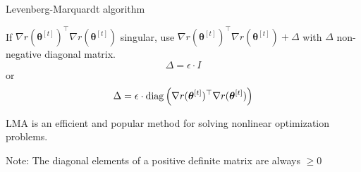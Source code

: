 \documentclass[11pt,compress,t,notes=noshow, xcolor=table]{beamer}
\begin{document}
%
%
%
%
\begin{vbframe}{Levenberg-Marquardt algorithm}

If $\nabla r(\bm{\theta}^{[t]})^\top\nabla r(\bm{\theta}^{[t]})$ singular, use $\nabla r(\bm{\theta}^{[t]})^\top\nabla r(\bm{\theta}^{[t]})+\Delta$ with $\Delta$ non-negative diagonal matrix.
\lz
$$
\Delta = \epsilon \cdot I
$$
or
$$
\Delta = \epsilon \cdot \operatorname{diag}\left(\nabla r(\bm{\theta}^{[t]})^\top\nabla r(\bm{\theta}^{[t]})\right)
$$

LMA is an efficient and popular method for solving nonlinear optimization problems.

\lz

Note: The diagonal elements of a positive definite matrix are always $\geq 0$

\end{vbframe}

\endlecture
\end{document}
